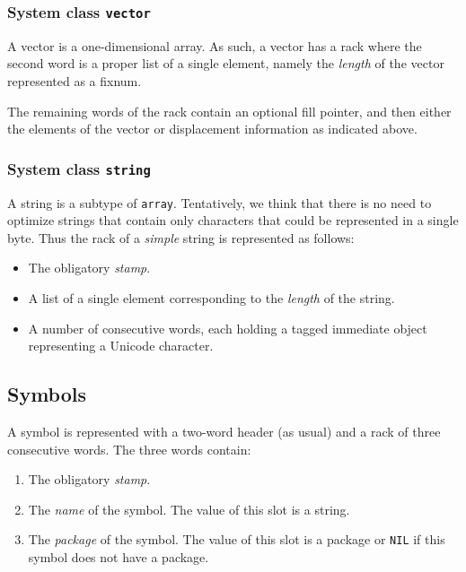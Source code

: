 \subsubsection{System class \texttt{vector}}

A vector is a one-dimensional array.  As such, a vector has a rack
where the second word is a proper list of a single element,
namely the \emph{length} of the vector represented as a fixnum.

The remaining words of the rack contain an optional fill
pointer, and then either the elements of the vector or displacement
information as indicated above.

\subsubsection{System class \texttt{string}}

A string is a subtype of \texttt{array}.  Tentatively, we think that
there is no need to optimize strings that contain only characters that
could be represented in a single byte. 
Thus the rack of a
\emph{simple} string is represented as follows:

\begin{itemize}
\item The obligatory \emph{stamp}.
\item A list of a single element corresponding to the \emph{length} of
  the string. %
\item A number of consecutive words, each holding a tagged immediate
  object representing a Unicode character.
\end{itemize}

\subsection{Symbols}

A symbol is represented with a two-word header (as usual) and a
rack of three consecutive words.  The three words contain:

\begin{enumerate}
\item The obligatory \emph{stamp}.
\item The \emph{name} of the symbol.  The value of this slot is a
  string.
\item The \emph{package} of the symbol.  The value of this slot is a
  package or \texttt{NIL} if this symbol does not have a package.
\end{enumerate}


